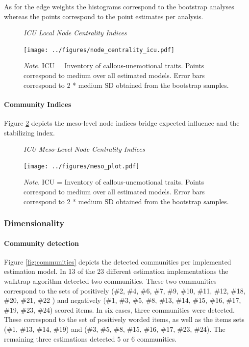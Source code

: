 \documentclass[a4paper,12pt]{article} %
\begin{document}
As for the edge weights the histograms correspond to the bootstrap analyses whereas the points correspond to the point estimates per analysis.

\begin{figure}[h!]
	\caption{\label{fig:icu_node_indices}\protect\linebreak[1]\textit{ICU Local Node Centrality Indices}}
	\centering
	\texttt{[image: ../figures/node\_centrality\_icu.pdf]}
	\caption*{\textit{Note.} ICU = Inventory of callous-unemotional traits. Points correspond to medium over all estimated models. Error bars correspond to 2 * medium SD obtained from the bootstrap samples.}
\end{figure}


\paragraph{Community Indices}
Figure \ref{fig:meso_plot} depicts the meso-level node indices bridge expected influence and the stabilizing index. 

\begin{figure}[h!]
	\caption{\label{fig:meso_plot}\protect\linebreak[1]\textit{ICU Meso-Level Node Centrality Indices}}
	\centering
	\texttt{[image: ../figures/meso\_plot.pdf]}
	\caption*{\textit{Note.} ICU = Inventory of callous-unemotional traits. Points correspond to medium over all estimated models. Error bars correspond to 2 * medium SD obtained from the bootstrap samples.}
\end{figure}

\subsubsection{Dimensionality}
\paragraph{Community detection}
Figure \ref{fig:communities} depicts the detected communities per implemented estimation model.
In 13 of the 23 different estimation implementations the walktrap algorithm detected two communities.
These two communities correspond to the sets of positively (\#2, \#4, \#6, \#7, \#9, \#10, \#11, \#12, \#18, \#20, \#21, \#22 ) and negatively (\#1, \#3, \#5, \#8, \#13, \#14, \#15, \#16, \#17, \#19, \#23, \#24) scored items.
In six cases, three communities were detected. 
These correspond to the set of positively worded items, as well as the items sets (\#1, \#13, \#14, \#19) and (\#3, \#5, \#8, \#15, \#16, \#17, \#23, \#24).    
The remaining three estimations detected 5 or 6 communities.
\end{document}
